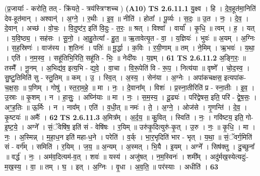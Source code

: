 \documentclass[17pt]{extarticle}
\begin{document}
                  \newline
                      (प्र॒जायाः᳚ - करोति॒ तत् - क्रि॑यते॒ - त्रय॑स्त्रिꣳशच्च )  \textbf{(A10)} \newline \newline
                                \textbf{ TS 2.6.11.1} \newline
                  यु॒क्ष्व । हि । दे॒व॒हूत॑मा॒निति॑ देव-हूत॑मान् । अश्वान्॑ । अ॒ग्ने॒ । र॒थीः । इ॒व॒ ॥ नीति॑ । होता᳚ । पू॒र्व्यः । स॒दः॒ ॥ उ॒त । नः॒ । दे॒व॒ । दे॒वान् । अच्छ॑ । वो॒चः॒ । वि॒दुष्ट॑र॒ इति॑ वि॒दुः - त॒रः॒ ॥ श्रत् । विश्वा᳚ । वार्या᳚ । कृ॒धि॒ ॥ त्वम् । ह॒ । यत् । य॒वि॒ष्ठ्य॒ । सह॑सः । सू॒नो॒ । आ॒हु॒तेत्या᳚ - हु॒त॒ ॥ ऋ॒तावेत्यृ॒त - वा॒ । य॒ज्ञियः॑ । भुवः॑ ॥ अ॒यम् । अ॒ग्निः । स॒ह॒स्रिणः॑ । वाज॑स्य । श॒तिनः॑ । पतिः॑ ॥ मू॒र्द्धा । क॒विः । र॒यी॒णाम् ॥ तम् । ने॒मिम् । ऋ॒भवः॑ । य॒था॒ । एति॑ । न॒म॒स्व॒ । सहू॑तिभि॒रिति॒ सहू॑ति - भिः॒ ॥ नेदी॑यः । य॒ज्ञ्म् । \textbf{  61} \newline
                  \newline
                                \textbf{ TS 2.6.11.2} \newline
                  अ॒ङ्गि॒रः॒ ॥ तस्मै᳚ । नू॒नम् । अ॒भिद्य॑व॒ इत्य॒भि - द्य॒वे॒ । वा॒चा । वि॒रू॒पेति॑ वि - रू॒प॒ । नित्य॑या ॥ वृष्णे᳚ । चो॒द॒स्व॒ । सु॒ष्टु॒तिमिति॑ सु - स्तु॒तिम् ॥ कम् । उ॒ । स्वि॒त् । अ॒स्य॒ । सेन॑या । अ॒ग्नेः । अपा॑कचक्षस॒ इत्यपा॑क-च॒क्ष॒सः॒ ॥ प॒णिम् । गोषु॑ । स्त॒रा॒म॒हे॒ ॥ मा । नः॒ । दे॒वाना᳚म् । विशः॑ । प्र॒स्ना॒तीरिति॑ प्र - स्ना॒तीः । इ॒व॒ । उ॒स्राः ॥ कृ॒शम् । न । हा॒सुः॒ । अघ्नि॑याः ॥ मा । नः॒ । स॒म॒स्य॒ । दू॒ढ्यः॑ । परि॑द्वेषस॒ इति॒ परि॑ - द्वे॒ष॒सः॒ । अꣳ॒॒ह॒तिः ॥ ऊ॒र्मिः । न । नाव᳚म् । एति॑ । व॒धी॒त् ॥ नमः॑ । ते॒ । अ॒ग्ने॒ । ओज॑से । गृ॒णन्ति॑ । दे॒व॒ । कृ॒ष्टयः॑ ॥ अमैः᳚ । \textbf{  62} \newline
                  \newline
                                \textbf{ TS 2.6.11.3} \newline
                  अ॒मित्र᳚म् । अ॒र्द॒य॒ ॥ कु॒वित् । स्विति॑ । नः॒ । गवि॑ष्टय॒ इति॒ गो-इ॒ष्ट॒ये॒ । अग्ने᳚ । सं॒ॅवेषि॑ष॒ इति॑ सं - वेषि॑षः । र॒यिम् ॥ उरु॑कृ॒दित्युरु॑-कृ॒त् । उ॒रु । नः॒ ॥ कृ॒धि॒ । मा । नः॒ । अ॒स्मिन्न् । म॒हा॒ध॒न इति॑ महा-ध॒ने । परेति॑ । व॒र्क् । भा॒र॒भृदिति॑ भार - भृत् । य॒था॒ ॥ सं॒ॅवर्ग॒मिति॑ सं - वर्ग᳚म् । समिति॑ । र॒यिम् । ज॒य॒ ॥ अ॒न्यम् । अ॒स्मत् । भि॒यै । इ॒यम् । अग्ने᳚ । सिष॑क्तु । दु॒च्छुना᳚ ॥ वर्द्ध॑ । नः॒ । अम॑व॒दित्यम॑-व॒त् । शवः॑ ॥ यस्य॑ । अजु॑षत् । न॒म॒स्विनः॑ । शमी᳚म् । अदु॑र्मख॒स्येत्यदुः॑-म॒ख॒स्य॒ । वा॒ ॥ तम् । घ॒ । इत् । अ॒ग्निः । वृ॒धा । अ॒व॒ति॒ ॥ पर॑स्याः । अधीति॑ । \textbf{  63} \newline
\end{document}
